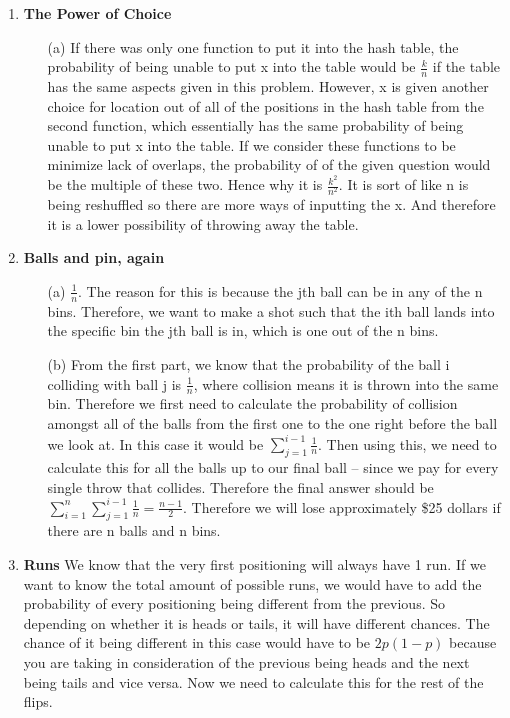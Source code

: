 \documentclass[12pt,fleqn]{article}
\begin{document}
\begin{enumerate}
  \newpage
  \item \textbf{The Power of Choice}
	\begin{itemize}
		\item[(a)] If there was only one function to put it into the hash table, the probability of being unable to put x into the table would be $\frac{k}{n}$ if the table has the same aspects given in this problem. However, x is given another choice for location out of all of the positions in the hash table from the second function, which essentially has the same probability of being unable to put x into the table. If we consider these functions to be minimize lack of overlaps, the probability of of the given question would be the multiple of these two. Hence why it is $\frac{k^2}{n^2}$. It is sort of like n is being reshuffled so there are more ways of inputting the x. And therefore it is a lower possibility of throwing away the table. 
	\end{itemize}
  
  \newpage
  \item \textbf{Balls and pin, again}
  	\begin{itemize}
  		\item[(a)] $\frac{1}{n}$. The reason for this is because the jth ball can be in any of the n bins. Therefore, we want to make a shot such that the ith ball lands into the specific bin the jth ball is in, which is one out of the n bins.
  		\item[(b)] From the first part, we know that the probability of the ball i colliding with ball j is $\frac{1}{n}$, where collision means it is thrown into the same bin. Therefore we first need to calculate the probability of collision amongst all of the balls from the first one to the one right before the ball we look at. In this case it would be $\sum^{i-1}_{j=1} \frac{1}{n}$. Then using this, we need to calculate this for all the balls up to our final ball -- since we pay for every single throw that collides. Therefore the final answer should be $\sum^{n}_{i=1} \sum^{i-1}_{j=1} \frac{1}{n} = \frac{n-1}{2}$. Therefore we will lose approximately \$25 dollars if there are n balls and n bins. 
  	\end{itemize}
  
  \newpage
  \item \textbf{Runs}
  We know that the very first positioning will always have 1 run. If we want to know the total amount of possible runs, we would have to add the probability of every positioning being different from the previous. So depending on whether it is heads or tails, it will have different chances. The chance of it being different in this case would have to be $2p(1-p)$ because you are taking in consideration of the previous being heads and the next being tails and vice versa. Now we need to calculate this for the rest of the flips. 
  

\end{enumerate}
\end{document}
